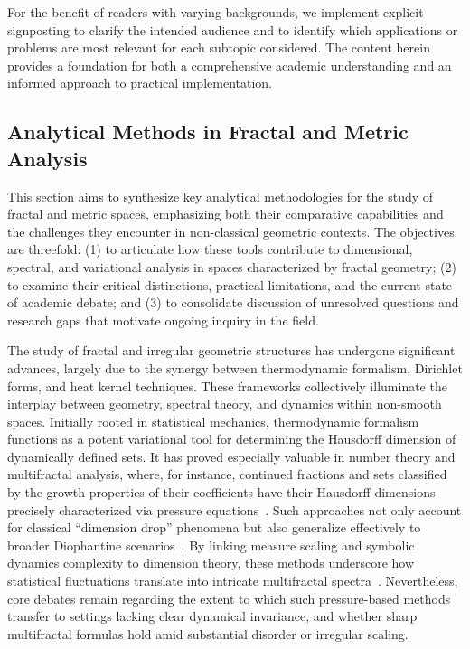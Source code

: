 \documentclass[sigconf]{acmart}
\begin{document}
For the benefit of readers with varying backgrounds, we implement explicit signposting to clarify the intended audience and to identify which applications or problems are most relevant for each subtopic considered. The content herein provides a foundation for both a comprehensive academic understanding and an informed approach to practical implementation.

\subsection{Analytical Methods in Fractal and Metric Analysis}

This section aims to synthesize key analytical methodologies for the study of fractal and metric spaces, emphasizing both their comparative capabilities and the challenges they encounter in non-classical geometric contexts. The objectives are threefold: (1) to articulate how these tools contribute to dimensional, spectral, and variational analysis in spaces characterized by fractal geometry; (2) to examine their critical distinctions, practical limitations, and the current state of academic debate; and (3) to consolidate discussion of unresolved questions and research gaps that motivate ongoing inquiry in the field.

The study of fractal and irregular geometric structures has undergone significant advances, largely due to the synergy between thermodynamic formalism, Dirichlet forms, and heat kernel techniques. These frameworks collectively illuminate the interplay between geometry, spectral theory, and dynamics within non-smooth spaces. Initially rooted in statistical mechanics, thermodynamic formalism functions as a potent variational tool for determining the Hausdorff dimension of dynamically defined sets. It has proved especially valuable in number theory and multifractal analysis, where, for instance, continued fractions and sets classified by the growth properties of their coefficients have their Hausdorff dimensions precisely characterized via pressure equations~\cite{ref38}. Such approaches not only account for classical ``dimension drop'' phenomena but also generalize effectively to broader Diophantine scenarios~\cite{ref13}. By linking measure scaling and symbolic dynamics complexity to dimension theory, these methods underscore how statistical fluctuations translate into intricate multifractal spectra~\cite{ref9}. Nevertheless, core debates remain regarding the extent to which such pressure-based methods transfer to settings lacking clear dynamical invariance, and whether sharp multifractal formulas hold amid substantial disorder or irregular scaling.
\end{document}
